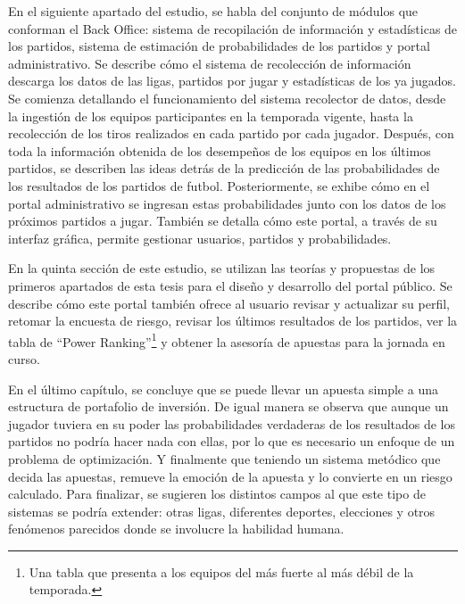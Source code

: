 En el siguiente apartado del estudio, se habla del conjunto de módulos que conforman el Back Office: sistema de recopilación de información y estadísticas de los partidos, sistema de estimación de probabilidades de los partidos y portal administrativo. Se describe cómo el sistema de recolección de información descarga los datos de las ligas, partidos por jugar y estadísticas de los ya jugados. Se comienza detallando el funcionamiento del sistema recolector de datos, desde la ingestión de los equipos participantes en la temporada vigente, hasta la recolección de los tiros realizados en cada partido por cada jugador. Después, con toda la información obtenida de los desempeños de los equipos en los últimos partidos, se describen las ideas detrás de la predicción de las probabilidades de los resultados de los partidos de futbol. Posteriormente, se exhibe cómo en el portal administrativo se ingresan estas probabilidades junto con los datos de los próximos partidos a jugar. También se detalla cómo este portal, a través de su interfaz gráfica, permite gestionar usuarios, partidos y probabilidades.


En la quinta sección de este estudio, se utilizan las teorías y propuestas de los primeros apartados de esta tesis para el diseño y desarrollo del portal público. Se describe cómo este portal también ofrece al usuario revisar y actualizar su perfil, retomar la encuesta de riesgo, revisar los últimos resultados de los partidos, ver la tabla de ``Power Ranking''\footnote{Una tabla que presenta a los equipos del más fuerte al más débil de la temporada.} y obtener la asesoría de apuestas para la jornada en curso.


En el último capítulo, se concluye que se puede llevar un apuesta simple a una estructura de portafolio de inversión. De igual manera se observa que aunque un jugador tuviera en su poder las probabilidades verdaderas de los resultados de los partidos no podría hacer nada con ellas, por lo que es necesario un enfoque de un problema de optimización. Y finalmente que teniendo un sistema metódico que decida las apuestas, remueve la emoción de la apuesta y lo convierte en un riesgo calculado. Para finalizar, se sugieren los distintos campos al que este tipo de sistemas se podría extender: otras ligas, diferentes deportes, elecciones y otros fenómenos parecidos donde se involucre la habilidad humana.

